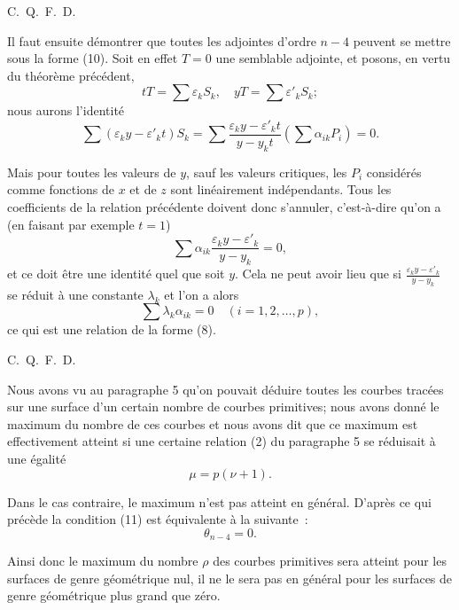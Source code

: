 \documentclass{article}
\begin{document}
C.~Q.~F.~D.

Il faut ensuite démontrer que toutes les adjointes d'ordre $n - 4$ peuvent se mettre sous la forme (10). Soit en effet $T = 0$ une semblable adjointe, et posons, en vertu du théorème précédent,
\[
tT = \sum \varepsilon_{k} S_{k}, \quad yT = \sum \varepsilon'_{k} S_{k};
\]
nous aurons l'identité
\[
\sum (\varepsilon_{k}y - \varepsilon'_{k}t) S_{k} = \sum \frac{\varepsilon_{k}y - \varepsilon'_{k}t}{y - y_{k}t}\left(\sum \alpha_{ik} P_{i}\right) = 0.
\]

Mais pour toutes les valeurs de $y$, sauf les valeurs critiques, les $P_{i}$ considérés comme fonctions de $x$ et de $z$ sont linéairement indépendants.
Tous les coefficients de la relation précédente doivent donc s'annuler, c'est-à-dire qu'on a (en faisant par exemple $t = 1$)
\[
\sum \alpha_{ik}\frac{\varepsilon_{k}y - \varepsilon'_{k}}{y - y_{k}} = 0,
\]
et ce doit être une identité quel que soit $y$. Cela ne peut avoir lieu que si $\frac{\varepsilon_{k}y - \varepsilon'_{k}}{y - y_{k}}$ se réduit à une constante $\lambda_{k}$ et l'on a alors
\[
\sum \lambda_{k}\alpha_{ik} = 0 \quad (i = 1, 2, \ldots, p),
\]
ce qui est une relation de la forme (8).

C.~Q.~F.~D.

Nous avons vu au paragraphe 5 qu'on pouvait déduire toutes les courbes tracées sur une surface d'un certain nombre de courbes primitives; nous avons donné le maximum du nombre de ces courbes et nous avons dit que ce maximum est effectivement atteint si une certaine relation (2) du paragraphe 5 se réduisait à une égalité
\[
\mu = p(\nu + 1). \tag{11}
\]

Dans le cas contraire, le maximum n'est pas atteint en général. D'après ce qui précède la condition (11) est équivalente à la suivante~:
\[
\theta_{n-4} = 0.
\]

Ainsi donc le maximum du nombre $\rho$ des courbes primitives sera atteint pour les surfaces de genre géométrique nul, il ne le sera pas en général pour les surfaces de genre géométrique plus grand que zéro.
\end{document}
